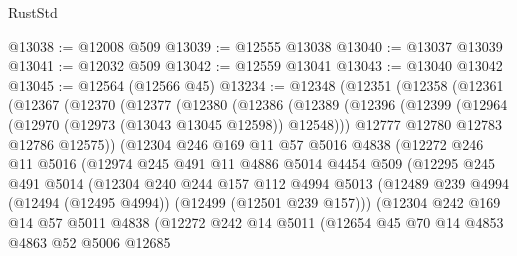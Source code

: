 \begin{lexlean}{RustStd}
\begin{coremodule}
@13038 := @12008 @509
@13039 := @12555 @13038
@13040 := @13037 @13039
@13041 := @12032 @509
@13042 := @12559 @13041
@13043 := @13040 @13042
@13045 := @12564 (@12566 @45)
@13234 := @12348
    (@12351
      (@12358
        (@12361
          (@12367
            (@12370
              (@12377
                (@12380
                  (@12386
                    (@12389
                      (@12396
                        (@12399 (@12964 (@12970 (@12973 (@13043 @13045 @12598)) @12548)))
                        @12777
                        @12780
                        @12783
                        @12786
                        @12575))
                    (@12304
                      @246
                      @169
                      @11
                      @57
                      @5016
                      @4838
                      (@12272
                        @246
                        @11
                        @5016
                        (@12974
                          @245
                          @491
                          @11
                          @4886
                          @5014
                          @4454
                          @509
                          (@12295
                            @245
                            @491
                            @5014
                            (@12304
                              @240
                              @244
                              @157
                              @112
                              @4994
                              @5013
                              (@12489
                                @239
                                @4994
                                (@12494 (@12495 @4994))
                                (@12499 (@12501 @239 @157)))
                              (@12304
                                @242
                                @169
                                @14
                                @57
                                @5011
                                @4838
                                (@12272
                                  @242
                                  @14
                                  @5011
                                  (@12654
                                    @45
                                    @70
                                    @14
                                    @4853
                                    @4863
                                    @52
                                    @5006
                                    @12685

\end{coremodule}
\end{lexlean}
